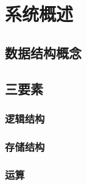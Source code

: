 
\chapter{系统概述}

\section{数据结构概念}


\section{三要素}


\subsection{逻辑结构}


\subsection{存储结构}


\subsection{运算}


